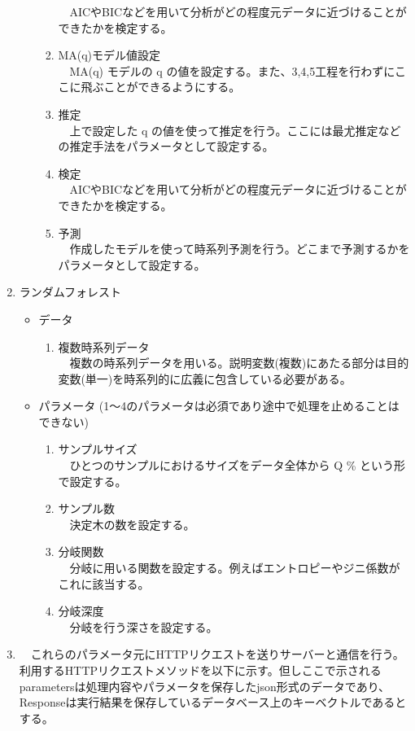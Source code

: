 \documentclass{scrartcl}
\begin{document}
\begin{enumerate}
\begin{itemize}
\begin{enumerate}
　AICやBICなどを用いて分析がどの程度元データに近づけることができたかを検定する。\\
\item MA(q)モデル値設定\\
　MA(q) モデルの q の値を設定する。また、3,4,5工程を行わずにここに飛ぶことができるようにする。\\
\item 推定\\
　上で設定した q の値を使って推定を行う。ここには最尤推定などの推定手法をパラメータとして設定する。\\
\item 検定\\
　AICやBICなどを用いて分析がどの程度元データに近づけることができたかを検定する。\\
\item 予測\\
　作成したモデルを使って時系列予測を行う。どこまで予測するかをパラメータとして設定する。\\
\end{enumerate}
\end{itemize}
\item ランダムフォレスト
\label{sec:orgcc8ff14}
\begin{itemize}
\item データ\\
\begin{enumerate}
\item 複数時系列データ\\
　複数の時系列データを用いる。説明変数(複数)にあたる部分は目的変数(単一)を時系列的に広義に包含している必要がある。\\
\end{enumerate}
\item パラメータ (1〜4のパラメータは必須であり途中で処理を止めることはできない)\\
\begin{enumerate}
\item サンプルサイズ\\
　ひとつのサンプルにおけるサイズをデータ全体から Q \% という形で設定する。\\
\item サンプル数\\
　決定木の数を設定する。\\
\item 分岐関数\\
　分岐に用いる関数を設定する。例えばエントロピーやジニ係数がこれに該当する。\\
\item 分岐深度\\
　分岐を行う深さを設定する。\\
\end{enumerate}
\end{itemize}
\item 
\label{sec:org7af9def}
　これらのパラメータ元にHTTPリクエストを送りサーバーと通信を行う。利用するHTTPリクエストメソッドを以下に示す。但しここで示されるparametersは処理内容やパラメータを保存したjson形式のデータであり、Responseは実行結果を保存しているデータベース上のキーベクトルであるとする。\\


\end{enumerate}
\end{document}
